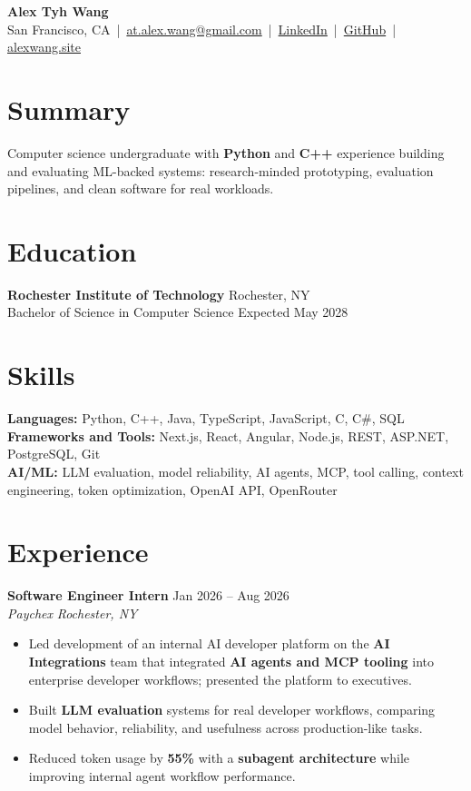 \documentclass[10pt,letterpaper]{article}
\newif\ifresumeFirstRole
\newcommand{\resumeRole}[4]{%
  \ifresumeFirstRole
    \global\resumeFirstRolefalse
  \else
    \vspace{0pt plus 1fill}%
  \fi
  \textbf{#1} \hfill #2\\
  \textit{#3} \hfill \textit{#4}
}
\begin{document}
\begin{center}
{\Large \textbf{Alex Tyh Wang}}\\
San Francisco, CA \,|\, \href{mailto:at.alex.wang@gmail.com}{at.alex.wang@gmail.com} \,|\, \href{https://www.linkedin.com/in/alex-tyh-wang/}{LinkedIn} \,|\, \href{https://github.com/alextyhwang}{GitHub} \,|\, \href{https://alexwang.site}{alexwang.site}
\end{center}

\section*{Summary}
Computer science undergraduate with \textbf{Python} and \textbf{C++} experience building and evaluating ML-backed systems: research-minded prototyping, evaluation pipelines, and clean software for real workloads.

\section*{Education}
\textbf{Rochester Institute of Technology} \hfill Rochester, NY\\
Bachelor of Science in Computer Science \hfill Expected May 2028

\section*{Skills}
\textbf{Languages:} Python, C++, Java, TypeScript, JavaScript, C, C\#, SQL\\
\textbf{Frameworks and Tools:} Next.js, React, Angular, Node.js, REST, ASP.NET, PostgreSQL, Git\\
\textbf{AI/ML:} LLM evaluation, model reliability, AI agents, MCP, tool calling, context engineering, token optimization, OpenAI API, OpenRouter

\section*{Experience}
\resumeRole{Software Engineer Intern}{Jan 2026 -- Aug 2026}{Paychex}{Rochester, NY}
\begin{itemize}
  \item Led development of an internal AI developer platform on the \textbf{AI Integrations} team that integrated \textbf{AI agents and MCP tooling} into enterprise developer workflows; presented the platform to executives.
  \item Built \textbf{LLM evaluation} systems for real developer workflows, comparing model behavior, reliability, and usefulness across production-like tasks.
  \item Reduced token usage by \textbf{55\%} with a \textbf{subagent architecture} while improving internal agent workflow performance.
\end{itemize}
\end{document}
